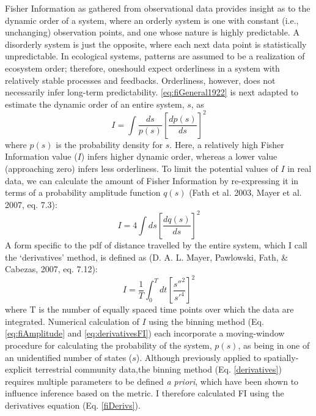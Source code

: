 \documentclass[12pt,twoside,openany]{reedthesis}
\begin{document}
Fisher Information as gathered from observational data provides insight
as to the dynamic order of a system, where an orderly system is one with
constant (i.e., unchanging) observation points, and one whose nature is
highly predictable. A disorderly system is just the opposite, where each
next data point is statistically unpredictable. In ecological systems,
patterns are assumed to be a realization of ecosystem order; therefore,
oneshould expect orderliness in a system with relatively stable
processes and feedbacks. Orderliness, however, does not necessarily
infer long-term predictability. \eqref{eq:fiGeneral1922} is next adapted
to estimate the dynamic order of an entire system, \(s\), as
\begin{equation} 
  I = \int \frac{ds}{p(s)}\left[\frac{dp(s)}{ds}\right]^2
\end{equation}
where \(p(s)\) is the probability density for \(s\). Here, a relatively
high Fisher Information value (\(I\)) infers higher dynamic order,
whereas a lower value (approaching zero) infers less orderliness. To
limit the potential values of \(I\) in real data, we can calculate the
amount of Fisher Information by re-expressing it in terms of a
probability amplitude function \(q(s)\) (Fath et al. 2003, Mayer et al.
2007, eq. 7.3):
\begin{equation}
  I = 4 \int ds\left[\frac{dq(s)}{ds}\right]^2
  \label{eq:fiAmplitude}
\end{equation}
A form specific to the pdf of distance travelled by the entire system,
which I call the `derivatives' method, is defined as (D. A. L. Mayer,
Pawlowski, Fath, \& Cabezas, 2007, eq. 7.12):
\begin{equation}
  I = \frac{1}{T} \int_0^T dt\left[\frac{s''^2}{s'^4}\right]^2
  \label{eq:fiDerivs}
\end{equation}
where T is the number of equally spaced time points over which the data
are integrated. Numerical calculation of \(I\) using the binning method
(Eq. \eqref{eq:fiAmplitude} and \eqref{eq:derivativesFI}) each incorporate a
moving-window procedure for calculating the probability of the system,
\(p(s)\), as being in one of an unidentified number of states (\(s\)).
Although previously applied to spatially-explicit terrestrial community
data,the binning method (Eq. \ref{derivatives}) requires multiple
parameters to be defined \emph{a priori}, which have been shown to
influence inference based on the metric. I therefore calculated FI using
the derivatives equation (Eq. \ref{fiDerivs}).
\end{document}
